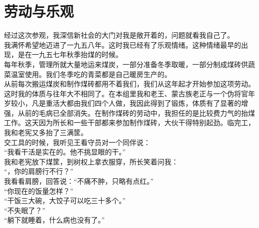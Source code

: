 \fancyhead[RO]{\thepage} %
\fancyhead[LE]{\thepage} %
\chapter*{劳动与乐观}
经过这次参观，我深信新社会的大门对我是敞开着的，问题就看我自己了。\\

我满怀希望地迈进了一九五八年。这时我已经有了乐观情绪。这种情绪最早的出现，是在一九五七年秋季抬煤的时候。\\

每年秋季，管理所就大量地运来煤炭，一部分准备冬季取暖，一部分制成煤砖供蔬菜温室使用。我们冬季吃的青菜都是自己暖房生产的。\\

从前每次搬运煤炭和制作煤砖都用不着我们，我们从这年起才开始参加这项劳动。这时我的体质与往年大不相同了。在本组里我和老王、蒙古族老正与一个伪将官年岁较小，凡是重活大都由我们四个人做，我因此得到了锻炼，体质有了显著的增强，从前的毛病已全部消失。在制作煤砖的劳动中，我担任的是比较费力气的抬煤工作。这天因为所长和一些干部都来参加制作煤砖，大伙干得特别起劲。临完工，我和老宪又多抬了三满筐。\\

交工具的时候，我听见王看守员对一个同伴说：\\

“我看干活是实在的。他不挑显眼的干。”\\

我和老宪放下煤筐，到树权上拿衣服穿，所长笑着问我：\\

“，你的肩膀行不行？”\\

我看看肩膀，回答说：“不痛不肿，只略有点红。”\\

“你现在的饭量怎样？”\\

“干饭三大碗，大饺子可以吃三十多个。”\\

“不失眠了？”\\

“躺下就睡着，什么病也没有了。”\\


